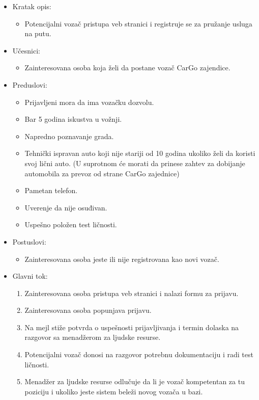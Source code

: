 \begin{itemize}
	\item Kratak opis:
		\begin{itemize}
			\item Potencijalni vozač pristupa veb stranici i registruje se za pružanje usluga na putu.
		\end{itemize}
	\item Učesnici:
		\begin{itemize}
			\item Zainteresovana osoba koja želi da postane vozač CarGo zajendice.
		\end{itemize}				
	\item Preduslovi:
		\begin{itemize}
		    \item Prijavljeni mora da ima vozačku dozvolu.
		    \item Bar 5 godina iskustva u vožnji.
		    \item Napredno poznavanje grada.
		    \item Tehnički ispravan auto koji nije stariji od 10 godina ukoliko želi da koristi svoj lični auto. (U suprotnom će morati da prinese zahtev za dobijanje automobila za prevoz od strane CarGo zajednice)
		    \item Pametan telefon.
		    \item Uverenje da nije osuđivan.
		    \item Uspešno položen test ličnosti.
		\end{itemize}
	\item Postuslovi:
		\begin{itemize}
			\item Zainteresovana osoba jeste ili nije registrovana kao novi vozač.
		\end{itemize}		
	\item Glavni tok:
		\begin{enumerate}
		    \item Zainteresovana osoba pristupa veb stranici i nalazi formu za prijavu.
		    \item Zainteresovana osoba popunjava prijavu.
		    \item Na mejl stiže potvrda o uspešnosti prijavljivanja i termin dolaska na razgovor sa menadžerom za ljudske resurse.
		    \item Potencijalni vozač donosi na razgovor potrebnu dokumentaciju i radi test ličnosti.
		    \item Menadžer za ljudske resurse odlučuje da li je vozač kompetentan za tu poziciju i ukoliko jeste sistem beleži novog vozača u bazi.

\end{enumerate}
\end{itemize}
